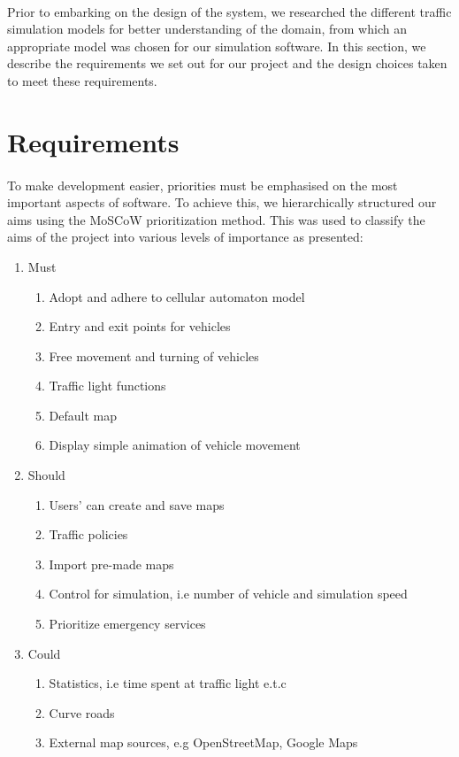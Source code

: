 \documentclass[a4paper,11pt,titlepage]{article}
\begin{document}
\paragraph{}
Prior to embarking on the design of the system, we researched the different traffic simulation models for better understanding of the domain, from which an appropriate model was chosen for our simulation software.
In this section, we describe the requirements we set out for our project and the design choices taken to meet these requirements.
\section{Requirements}
\paragraph{}
To make development easier, priorities must be emphasised on the most important aspects of software. To achieve this, we hierarchically structured our aims using the MoSCoW prioritization method. This was used to classify the aims of the project into various levels of importance as presented:
\begin{enumerate}\itemsep1pt \parskip0pt 
	\item{Must}
		\begin{enumerate}\itemsep1pt \parskip0pt 
			\item{Adopt and adhere to cellular automaton model}
			\item{Entry and exit  points for vehicles}
			\item{Free movement and turning of vehicles}
			\item{Traffic light functions}
			\item{Default map}
			\item{Display simple animation of vehicle movement}
		\end{enumerate}
	\item{Should}
		\begin{enumerate}\itemsep1pt \parskip0pt 
			\item{Users' can create and save maps}
			\item{Traffic policies}
			\item{Import pre-made maps}
			\item{Control for simulation, i.e number of vehicle and simulation speed}
			\item{Prioritize emergency services}
		\end{enumerate}
	\item{Could}
		\begin{enumerate}\itemsep1pt \parskip0pt 
			\item{Statistics, i.e time spent at traffic light e.t.c}
			\item{Curve roads}
			\item{External map sources, e.g OpenStreetMap, Google Maps }
		\end{enumerate}
\end{enumerate}
\end{document}
